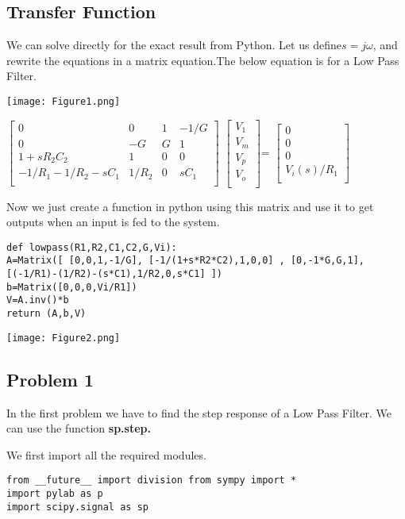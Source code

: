 \documentclass[10pt,english, openany]{book}
\begin{document}
\subsection{Transfer Function}
We can solve directly for the exact result from Python. Let us define$s = j\omega$,
and rewrite the equations in a matrix equation.The below equation is for a
Low Pass Filter.

{\centering \texttt{[image: Figure1.png]}}


$
\begin{bmatrix}
0 & 0 & 1 &  -1/G\\
0&-G&G&1\\
1+sR_{2}C_{2}&1&0&0\\
-1/R_{1}-1/R_{2}-sC_{1}&1/R_{2}&0&sC_{1}\\
\end{bmatrix}
$ $\begin{bmatrix}
V_{1}\\
V_{m}\\
V_{p}\\
V_{o}\\
\end{bmatrix}$= $\begin{bmatrix}
0\\
0\\
0\\
V_{i}(s)/R_{1}\\
\end{bmatrix}$


Now we just create a function in python using this matrix and use it to get outputs when an input is fed to the system.


\begin{verbatim}
def lowpass(R1,R2,C1,C2,G,Vi):
A=Matrix([ [0,0,1,-1/G], [-1/(1+s*R2*C2),1,0,0] , [0,-1*G,G,1], 
[(-1/R1)-(1/R2)-(s*C1),1/R2,0,s*C1] ]) 
b=Matrix([0,0,0,Vi/R1])
V=A.inv()*b
return (A,b,V)
\end{verbatim}

{\centering \texttt{[image: Figure2.png]}}

\subsection{Problem 1}

In the first problem we have to find the step response of a Low Pass Filter. We can use the function \textbf{sp.step.}\par
We first import all the required modules.

\begin{verbatim}
from __future__ import division from sympy import *
import pylab as p
import scipy.signal as sp
\end{verbatim}
\end{document}
